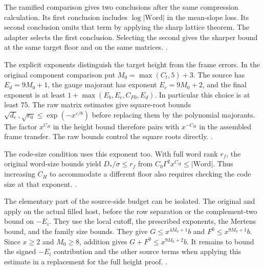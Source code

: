 The ramified comparison gives two conclusions after the same
compression calculation. Its first conclusion includes
\(\log|\mathrm{Word}|\) in the mean-slope loss. Its second conclusion
omits that term by applying the sharp lattice theorem.
The adapter  selects the first
conclusion. Selecting the second gives the sharper bound at the
same target floor and on the same matrices.
.

The explicit exponents distinguish the target height from the
frame errors. In the original component comparison put
\(M_0=\max(C_t,5)+3\). The source has
\(E_d=9M_0+1\), the gauge majorant has exponent
\(E_c=9M_0+2\), and the final exponent is at least
\(1+\max(E_b,E_c,C_{F0},E_d)\). In particular this choice is at
least \(75\). The raw matrix estimates give square-root bounds
\(\sqrt{d_e},\sqrt{e_0}\le\exp(-x^{\varepsilon/8})\)
before replacing them by the polynomial majorants. The factor
\(x^{C_H}\) in the height bound therefore pairs with
\(x^{-C_H}\) in the assembled frame transfer. The raw bounds control the square roots directly.
.



The code-size condition uses this exponent too. With full word
rank \(r_f\), the original word-size bounds yield
\(D_*/\sigma\le r_f\) from
\(C_0\Gamma^2x^{C_H}\le|\mathrm{Word}|\).
Thus increasing \(C_H\) to accommodate a different floor also
requires checking the code size at that exponent.
.

The elementary part of the source-side budget can be isolated.
The original  and  apply on the
actual filled host, before the row separation or the
complement-two bound on \(-E_i\). They use the local cutoff,
the prescribed exponents, the Mertens bound, and the family size
bounds. They give \(G\le x^{4M_0+1}b\) and
\(F^0\le x^{9M_0+1}b\). Since \(x\ge2\) and \(M_0\ge8\), addition
gives \(G+F^0\le x^{9M_0+2}b\). It remains to bound the
signed \( -E_i\) contribution and the other source terms when
applying this estimate in a replacement for the full height proof.
.


